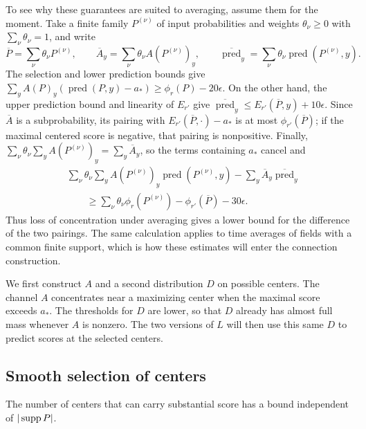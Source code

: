 To see why these guarantees are suited to averaging, assume them for the
moment.  Take a finite family $P^{(\nu)}$ of input probabilities and weights
$\theta_\nu\ge0$ with $\sum_\nu\theta_\nu=1$, and write
\[
 \overline P=\sum_\nu\theta_\nu P^{(\nu)},\qquad
 \overline A_y=\sum_\nu\theta_\nu A(P^{(\nu)})_y,\qquad
 \overline{\operatorname{pred}}_y
       =\sum_\nu\theta_\nu\operatorname{pred}(P^{(\nu)},y).
\]
The selection and lower prediction bounds give
$\sum_yA(P)_y(\operatorname{pred}(P,y)-a_*)\ge\phi_r(P)-20\epsilon$.
On the other hand, the upper prediction bound and linearity of $E_{r'}$
give
$\overline{\operatorname{pred}}_y
\le E_{r'}(\overline P,y)+10\epsilon$.
Since $\overline A$ is a subprobability, its pairing with
$E_{r'}(\overline P,\cdot)-a_*$ is at most
$\phi_{r'}(\overline P)$; if the maximal centered score is negative, that
pairing is nonpositive.  Finally,
$\sum_\nu\theta_\nu\sum_yA(P^{(\nu)})_y=\sum_y\overline A_y$, so
the terms containing $a_*$ cancel and
\begin{equation}
 \begin{split}
 &\sum_\nu\theta_\nu\sum_y
       A(P^{(\nu)})_y\operatorname{pred}(P^{(\nu)},y)
       -\sum_y\overline A_y\overline{\operatorname{pred}}_y\\
 &\hspace{2em}\ge
       \sum_\nu\theta_\nu\phi_r(P^{(\nu)})
       -\phi_{r'}(\overline P)-30\epsilon.
 \end{split}
 \label{ch:averaging-drop}
\end{equation}
Thus loss of concentration under averaging gives a lower bound for the
difference of the two pairings.  The same calculation applies to time
averages of fields with a common finite support, which is how these
estimates will enter the connection construction.

We first construct $A$ and a second distribution $D$ on possible centers.
The channel $A$ concentrates near a maximizing center when the maximal score
exceeds $a_*$.  The thresholds for $D$ are lower, so that $D$ already has
almost full mass whenever $A$ is nonzero.  The two versions of $L$ will then
use this same $D$ to predict scores at the selected centers.

\subsection{Smooth selection of centers}

The number of centers that can carry substantial score has a bound
independent of $|\operatorname{supp} P|$.

